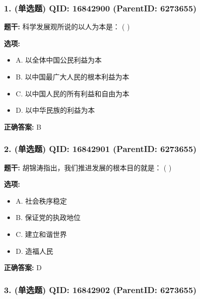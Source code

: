 \documentclass[12pt,UTF8]{ctexart}
\begin{document}
\subsubsection*{1. (单选题) \small QID: 16842900 (ParentID: 6273655)}

\textbf{题干:}
科学发展观所说的以人为本是： ( )



\textbf{选项:}
\begin{itemize}[leftmargin=*]

  \item A. 以全体中国公民利益为本

  \item B. 以中国最广大人民的根本利益为本

  \item C. 以中国人民的所有利益和自由为本

  \item D. 以中华民族的利益为本

\end{itemize}

\textbf{正确答案:}
B

\vspace{0.3em}\hrulefill\vspace{0.7em}

\subsubsection*{2. (单选题) \small QID: 16842901 (ParentID: 6273655)}

\textbf{题干:}
胡锦涛指出，我们推进发展的根本目的就是： ( )



\textbf{选项:}
\begin{itemize}[leftmargin=*]

  \item A. 社会秩序稳定

  \item B. 保证党的执政地位

  \item C. 建立和谐世界

  \item D. 造福人民

\end{itemize}

\textbf{正确答案:}
D

\vspace{0.3em}\hrulefill\vspace{0.7em}

\subsubsection*{3. (单选题) \small QID: 16842902 (ParentID: 6273655)}
\end{document}
